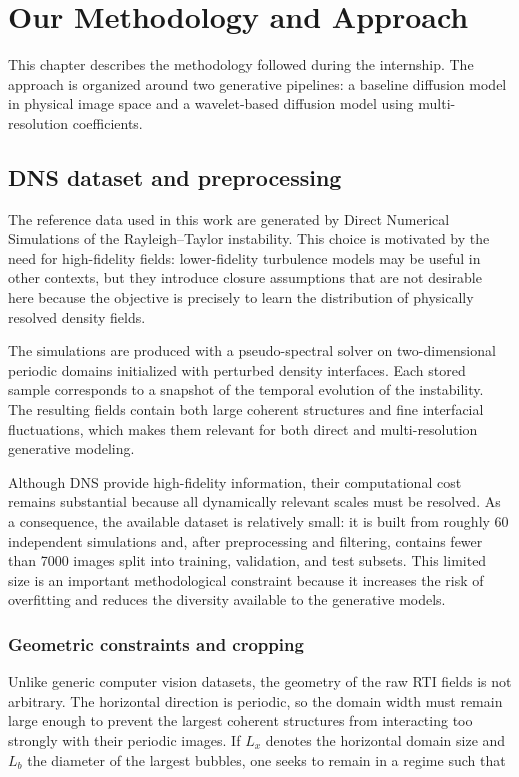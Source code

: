 ﻿\chapter{Our Methodology and Approach}
\label{chap:methodology}

This chapter describes the methodology followed during the internship. The approach is organized around two generative pipelines: a baseline diffusion model in physical image space and a wavelet-based diffusion model using multi-resolution coefficients.

\section{DNS dataset and preprocessing}

The reference data used in this work are generated by Direct Numerical
Simulations of the Rayleigh--Taylor instability. This choice is motivated by
the need for high-fidelity fields: lower-fidelity turbulence models may be
useful in other contexts, but they introduce closure assumptions that are not
desirable here because the objective is precisely to learn the distribution of
physically resolved density fields.

The simulations are produced with a pseudo-spectral solver on two-dimensional
periodic domains initialized with perturbed density interfaces. Each stored
sample corresponds to a snapshot of the temporal evolution of the instability.
The resulting fields contain both large coherent structures and fine
interfacial fluctuations, which makes them relevant for both direct and
multi-resolution generative modeling.

Although DNS provide high-fidelity information, their computational cost
remains substantial because all dynamically relevant scales must be resolved.
As a consequence, the available dataset is relatively small: it is built from
roughly 60 independent simulations and, after preprocessing and filtering,
contains fewer than 7000 images split into training, validation, and test
subsets. This limited size is an important methodological constraint because it
increases the risk of overfitting and reduces the diversity available to the
generative models.

\subsection{Geometric constraints and cropping}

Unlike generic computer vision datasets, the geometry of the raw RTI fields is
not arbitrary. The horizontal direction is periodic, so the domain width must
remain large enough to prevent the largest coherent structures from interacting
too strongly with their periodic images. If $L_x$ denotes the horizontal
domain size and $L_b$ the diameter of the largest bubbles, one seeks to remain
in a regime such that

